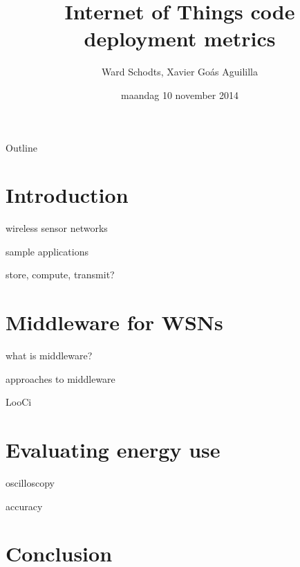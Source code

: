 \documentclass[presentation]{beamer}
\author{Ward Schodts, Xavier Goás Aguililla}
\date{maandag 10 november 2014}
\title{Internet of Things code deployment metrics}
\begin{document}
\maketitle
\begin{frame}{Outline}
\tableofcontents
\end{frame}


\section{Introduction}
\label{sec-1}
\begin{frame}[label=sec-1-1]{wireless sensor networks}
\end{frame}
\begin{frame}[label=sec-1-2]{sample applications}
\end{frame}
\begin{frame}[label=sec-1-3]{store, compute, transmit?}
\end{frame}
\section{Middleware for WSNs}
\label{sec-2}
\begin{frame}[label=sec-2-1]{what is middleware?}
\end{frame}
\begin{frame}[label=sec-2-2]{approaches to middleware}
\end{frame}
\begin{frame}[label=sec-2-3]{LooCi}
\end{frame}
\section{Evaluating energy use}
\label{sec-3}
\begin{frame}[label=sec-3-1]{oscilloscopy}
\end{frame}
\begin{frame}[label=sec-3-2]{accuracy}
\end{frame}
\section{Conclusion}
\label{sec-4}
\end{document}
